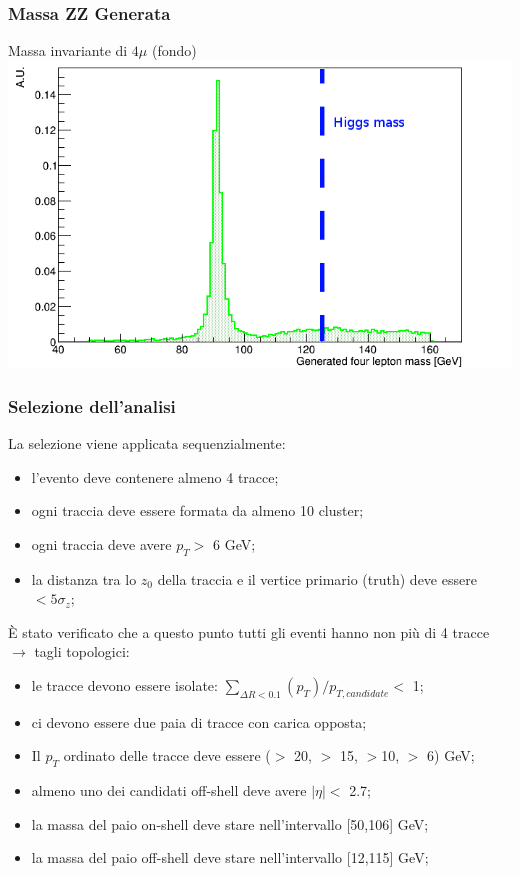 \documentclass{beamer}
\begin{document}
\begin{frame}
\frametitle{Massa ZZ Generata}
\centering
Massa invariante di $4\mu$ (fondo)
\includegraphics[width=.9\textwidth]{ZZ4mu/gen4muMass4}
\end{frame}



\begin{frame}[t]
\frametitle{Selezione dell'analisi}

La selezione viene applicata sequenzialmente:
\begin{itemize}
\item l'evento deve contenere almeno 4 tracce;
\item ogni traccia deve essere formata da almeno 10 cluster;
\item ogni traccia deve avere $p_{T} >$ 6 GeV;
\item la distanza tra lo $z_{0}$ della traccia e il vertice primario (truth) deve essere $< 5\sigma_{z}$;
\end{itemize}
\medskip
\`E stato verificato che a questo punto tutti gli eventi hanno non pi\`u di 4 tracce $\rightarrow$ tagli topologici:
\begin{itemize}
\item le tracce devono essere isolate: $\sum_{\Delta R < 0.1} (p_{T}) / p_{T, candidate} <$ 1;
\item ci devono essere due paia di tracce con carica opposta;
\item Il $p_{T}$ ordinato delle tracce deve essere ($>$ 20, $>$ 15, $>$10, $>$ 6) GeV;
\item almeno uno dei candidati off-shell
deve avere $|\eta| <$ 2.7;
\item la massa del paio on-shell deve stare nell'intervallo [50,106] GeV;
\item la massa del paio off-shell deve stare nell'intervallo [12,115] GeV;
\end{itemize}

\end{frame}
\end{document}
